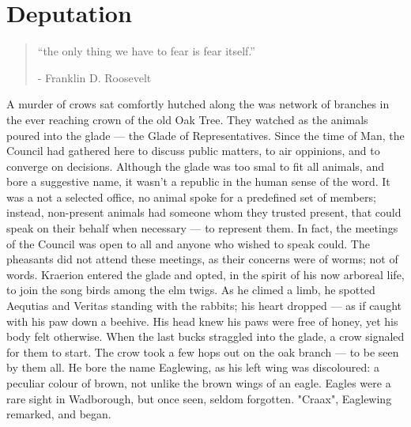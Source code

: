 \chapter{Deputation}

\vspace{-1.3cm}
\begin{localsize}{10}
	\begin{quote}
		“the only thing we have to fear is fear itself.”
		\begin{flushright}- Franklin D. Roosevelt \end{flushright}
	\end{quote} 
\end{localsize}
\vspace{1cm}

A murder of crows sat comfortly hutched along the was network of branches in the ever reaching crown of the old Oak Tree. They watched as the animals poured into the glade — the Glade of Representatives. Since the time of Man, the Council had gathered here to discuss public matters, to air oppinions, and to converge on decisions. Although the glade was too smal to fit all animals, and bore a suggestive name, it wasn't a republic in the human sense of the word. It was a not a selected office, no animal spoke for a predefined set of members; instead, non-present animals had someone whom they trusted present, that could speak on their behalf when necessary — to represent them.
In fact, the meetings of the Council was open to all and anyone who wished to speak could. The pheasants did not attend these meetings, as their concerns were of worms; not of words.
Kraerion entered the glade and opted, in the spirit of his now arboreal life, to join the song birds among the elm twigs. As he climed a limb, he spotted Aequtias and Veritas standing with the rabbits; his heart dropped — as if caught with his paw down a beehive. His head knew his paws were free of honey, yet his body felt otherwise.
When the last bucks straggled into the glade, a crow signaled for them to start. The crow took a few hops out on the oak branch — to be seen by them all. He bore the name Eaglewing, as his left wing was discoloured: a peculiar colour of brown, not unlike the brown wings of an eagle. Eagles were a rare sight in Wadborough, but once seen, seldom forgotten.
"Craax", Eaglewing remarked, and began.

